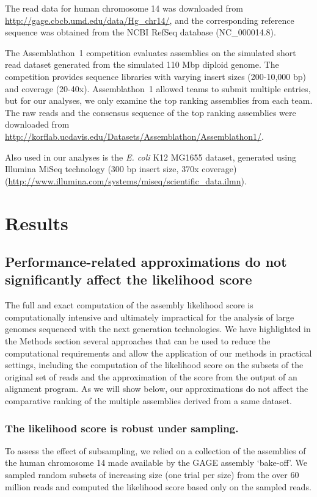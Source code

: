 \documentclass[12pt,\mydriver]{thesis}
\begin{document}
The read data for human chromosome 14 was downloaded from \url{http://gage.cbcb.umd.edu/data/Hg_chr14/}, and the corresponding reference sequence was obtained from the NCBI RefSeq database (NC\_000014.8).

The Assemblathon~1 competition evaluates assemblies on the simulated
short read dataset generated from the simulated 110 Mbp diploid genome.
The competition provides sequence libraries with varying insert sizes (200-10,000 bp)
and coverage (20-40x).
Assemblathon~1 allowed teams to submit multiple entries, but for our
analyses, we only examine the top ranking assemblies from each
team. The raw reads and the consensus sequence of the top ranking
assemblies were downloaded from \url{http://korflab.ucdavis.edu/Datasets/Assemblathon/Assemblathon1/}.

Also used in our analyses is the \emph{E. coli} K12 MG1655 dataset, generated using Illumina MiSeq technology
(300 bp insert size, 370x coverage) ({\url{http://www.illumina.com/systems/miseq/scientific_data.ilmn}}).

\section{Results}

\subsection{Performance-related approximations do not significantly
  affect the likelihood score}

The full and exact computation of the assembly likelihood score is
computationally intensive and ultimately impractical for the analysis
of large genomes sequenced with the next generation technologies. We have
highlighted in the Methods section several approaches that can be used
to reduce the computational requirements and allow the application of
our methods in practical settings, including the computation of the
likelihood score on the subsets of the original set of reads and the
approximation of the score from the output of an alignment program.
As we will show below,
our approximations do not affect the comparative ranking of the multiple assemblies derived from a same dataset.

\subsubsection{The likelihood score is robust under sampling.} To assess the
effect of subsampling, we relied on a collection of the assemblies of the
human chromosome 14 made available by the GAGE assembly `bake-off'.
We sampled random subsets of increasing size (one trial per
size) from the over 60 million reads and
computed the likelihood score based only on the sampled reads.
\end{document}

